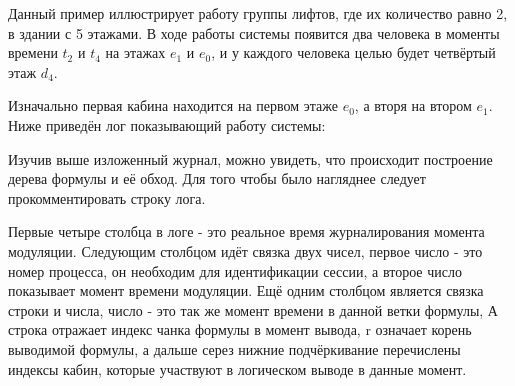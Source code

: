 	Данный пример иллюстрирует работу группы лифтов, где их количество равно 2, в здании с 5 этажами.
		В ходе работы системы появится два человека в моменты времени $t_2$ и $t_4$ на этажах $e_1$ и $e_0$,
		и у каждого человека целью будет четвёртый этаж $d_4$.

	Изначально первая кабина находится на первом этаже $e_0$, а вторя на втором $e_1$.
		Ниже приведён лог показывающий работу системы:


Изучив выше изложенный журнал, можно увидеть, что происходит построение дерева формулы и её обход.
	Для того чтобы было нагляднее следует прокомментировать строку лога.

Первые четыре столбца в логе - это реальное время журналирования момента модуляции.
	Следующим столбцом идёт связка двух чисел, первое число - это номер процесса,
	он необходим для идентификации сессии, а второе число показывает момент времени модуляции.
	Ещё одним столбцом является связка строки и числа, число - это так же момент времени в данной ветки формулы,
	А строка отражает индекс чанка формулы в момент вывода, r означает корень выводимой формулы, а дальше серез нижние подчёркивание перечислены индексы кабин, которые участвуют в логическом выводе в данные момент.

